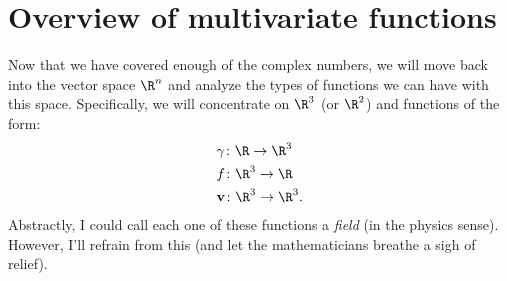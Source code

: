    
        \section{Overview of multivariate functions}
        Now that we have covered enough of the complex numbers, we will move back into the vector space $\R^n$ and analyze the types of functions we can have with this space.  Specifically, we will concentrate on $\R^3$ (or $\R^2$) and functions of the form:
        \begin{align}
            &\gamma\colon \R \to \R^3\\
            &f\colon \R^3 \to \R\\
            &\mathbf{v}\colon \R^3 \to \R^3.
        \end{align}
        Abstractly, I could call each one of these functions a \emph{field} (in the physics sense).  However, I'll refrain from this (and let the mathematicians breathe a sigh of relief).
        
